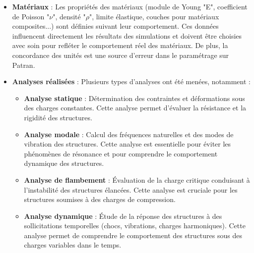 \begin{itemize}
    \begin{align*}
	\text{Encastrement : } 	& \begin{cases}	\text{Translations}&<0,0,0>\\ 
						\text{Rotations}&<0,0,0>  \end{cases}\\
	\text{Appui simple : } 	& \begin{cases}	\text{Translations}&<~,~,0>\\ 
						\text{Rotations}&<0,0,~>  \end{cases}\\	
	\text{Libre : } 	& \begin{cases}	\text{Translations}&<~,~ ,~ >\\ 
						\text{Rotations}&<~ ,~ ,~ > \end{cases}\\
    \end{align*}

    \item \textbf{Matériaux} :
    Les propriétés des matériaux (module de Young "E", coefficient de Poisson "$\nu$", densité "$\rho$", 
    limite élastique, couches pour matériaux composites...) sont définies suivant leur 
    comportement. Ces données influencent directement les résultats des simulations et doivent être 
    choisies avec soin pour refléter le comportement réel des matériaux. De plus, la 
    concordance des unités est une source d'erreur dans le paramétrage sur Patran. 


    \item \textbf{Analyses réalisées} :
    Plusieurs types d'analyses ont été menées, notamment :
    \begin{itemize}
        \item \textbf{Analyse statique} : Détermination des contraintes et déformations 
	sous des charges constantes. Cette analyse permet d'évaluer la résistance et la 
	rigidité des structures.
        \item \textbf{Analyse modale} : Calcul des fréquences naturelles et des modes 
	de vibration des structures. Cette analyse est essentielle pour éviter les 
	phénomènes de résonance et pour comprendre le comportement dynamique des 
	structures.
        \item \textbf{Analyse de flambement} : Évaluation de la charge critique 
	conduisant à l'instabilité des structures élancées. Cette analyse est cruciale 
	pour les structures soumises à des charges de compression.
        \item \textbf{Analyse dynamique} : Étude de la réponse des structures à des 
	sollicitations temporelles (chocs, vibrations, charges harmoniques). Cette 
	analyse permet de comprendre le comportement des structures sous des charges 
	variables dans le temps.
    \end{itemize}
\end{itemize}

